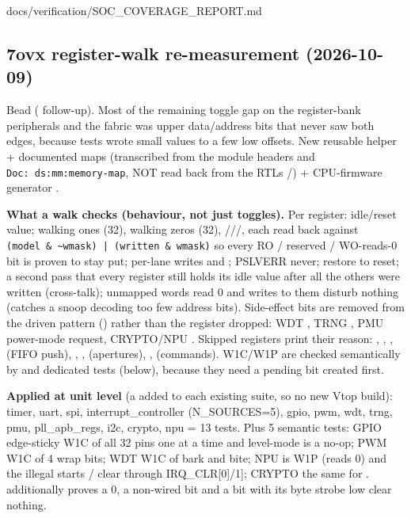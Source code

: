 \begin{relocated}{docs/verification/SOC_COVERAGE_REPORT.md}
\subsection{7ovx register-walk re-measurement (2026-10-09)}\label{tm:flow:soc-coverage-report:7ovx-register-walk-re-measurement-2026-10-09}

Bead  ( follow-up). Most of the remaining toggle gap
on the register-bank peripherals and the fabric was upper
data/\allowbreak{}address bits that never saw both edges, because tests
wrote small values to a few low offsets. New reusable helper
 + documented maps 
(transcribed from the module headers and
\texttt{Doc:\allowbreak{}\ ds:\allowbreak{}mm:\allowbreak{}memory-\allowbreak{}map},
NOT read back from the RTL\textquotesingle s
/) + CPU-firmware generator
.

\textbf{What a walk checks (behaviour, not just toggles).} Per register:
idle/\allowbreak{}reset value; walking ones (32), walking zeros (32),
///, each
read back against
\texttt{(model\ \&\ \textasciitilde{}wmask)\ |\ (written\ \&\ wmask)} so
every RO / reserved / WO-reads-0 bit is proven to stay put; per-lane
 writes and ; PSLVERR never; restore to reset;
a second pass that every register still holds its idle value after all
the others were written (cross-talk); unmapped words read 0 and writes
to them disturb nothing (catches a snoop decoding too few address bits).
Side-effect bits are removed from the driven pattern ()
rather than the register dropped: WDT , TRNG
, PMU  power-mode request,
CRYPTO/\allowbreak{}NPU . Skipped registers print their
reason: , , ,
 (FIFO push), , ,
 (apertures), , 
(commands). W1C/W1P are checked semantically by  and
dedicated tests (below), because they need a pending bit created first.

\textbf{Applied at unit level} (a  added to
each existing suite, so no new Vtop build): timer, uart, spi,
interrupt\_\allowbreak{}controller (N\_\allowbreak{}SOURCES=5), gpio,
pwm, wdt, trng, pmu, pll\_\allowbreak{}apb\_\allowbreak{}regs, i2c,
crypto, npu = 13 tests. Plus 5 semantic tests: GPIO edge-sticky W1C of
all 32 pins one at a time and level-mode  is a no-op;
PWM W1C of 4 wrap bits; WDT W1C of bark and bite; NPU 
is W1P (reads 0) and the illegal start\textquotesingle s
/ clear through
IRQ\_\allowbreak{}CLR{[}0{]}/\allowbreak{}{[}1{]}; CRYPTO the same for
.  additionally proves a 0, a non-wired bit
and a bit with its byte strobe low clear nothing.


\end{relocated}
